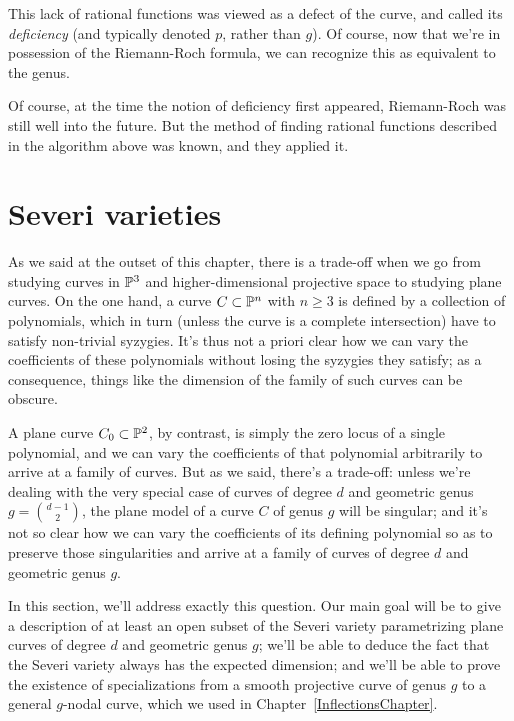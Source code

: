 This lack of rational functions was viewed as a defect of the curve, and called its \emph{deficiency} (and typically denoted $p$, rather than $g$). Of course, now that we're in possession of the Riemann-Roch formula, we can recognize this as equivalent to the genus.

Of course, at the time the notion of deficiency first appeared, Riemann-Roch was still well into the future. But the method of finding rational functions described in the algorithm above was known, and they applied it. 

\section{Severi varieties}\label{severi variety}

As we said at the outset of this chapter, there is a trade-off when we go from studying curves in ${\mathbb P}^3$ and higher-dimensional projective space to studying plane curves. On the one hand, a curve $C \subset {\mathbb P}^n$ with $n \geq 3$ is defined by a collection of polynomials, which in turn (unless the curve is a complete intersection) have to satisfy non-trivial syzygies. It's thus not a priori clear how we can vary the coefficients of these polynomials without losing the syzygies they satisfy; as a consequence, things like the dimension of the family of such curves can be obscure.

A plane curve $C_0 \subset {\mathbb P}^2$, by contrast, is simply the zero locus of a single polynomial, and we can vary the coefficients of that polynomial arbitrarily to arrive at a family of curves. But as we said, there's a trade-off: unless we're dealing with the very special case of curves of degree $d$ and geometric genus $g = \binom{d-1}{2}$, the plane model of a curve $C$ of genus $g$ will be singular; and it's not so clear how we can vary the coefficients of its defining polynomial so as to preserve those singularities and arrive at a family of curves of degree $d$ and geometric genus $g$.

In this section, we'll address exactly this question. Our main goal will be to give a description of at least an open subset of the Severi variety parametrizing plane curves of degree $d$ and geometric genus $g$; we'll be able to deduce the fact that the Severi variety always has the expected dimension; and we'll be able to prove the existence of specializations from a smooth projective curve of genus $g$ to a general $g$-nodal curve, which we used in Chapter~\ref{InflectionsChapter}.

